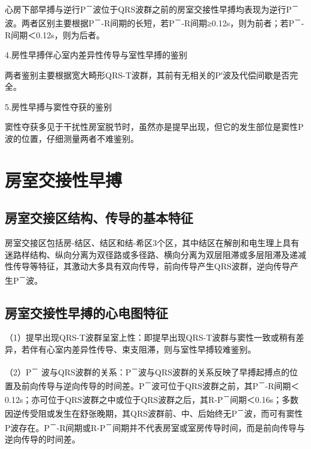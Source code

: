 心房下部早搏与逆行P\textsuperscript{－}波位于QRS波群之前的房室交接性早搏均表现为逆行P\textsuperscript{－}波。两者区别主要根据P\textsuperscript{－}-R间期的长短，若P\textsuperscript{－}-R间期≥0.12s，则为前者；若P\textsuperscript{－}-R间期＜0.12s，则为后者。

4.房性早搏伴心室内差异性传导与室性早搏的鉴别

两者鉴别主要根据宽大畸形QRS-T波群，其前有无相关的P′波及代偿间歇是否完全。

5.房性早搏与窦性夺获的鉴别

窦性夺获多见于干扰性房室脱节时，虽然亦是提早出现，但它的发生部位是窦性P波的位置，仔细测量两者不难鉴别。

\protect\hypertarget{text00018.htmlux5cux23subid143}{}{}

\section{房室交接性早搏}

\protect\hypertarget{text00018.htmlux5cux23subid144}{}{}

\subsection{房室交接区结构、传导的基本特征}

房室交接区包括房-结区、结区和结-希区3个区，其中结区在解剖和电生理上具有迷路样结构、纵向分离为双径路或多径路、横向分离为双层阻滞或多层阻滞及递减性传导等特征，其激动大多具有双向传导，前向传导产生QRS波群，逆向传导产生P\textsuperscript{－}波。

\protect\hypertarget{text00018.htmlux5cux23subid145}{}{}

\subsection{房室交接性早搏的心电图特征}

（1）提早出现QRS-T波群呈室上性：即提早出现QRS-T波群与窦性一致或稍有差异，若伴有心室内差异性传导、束支阻滞，则与室性早搏较难鉴别。

（2）P\textsuperscript{－} 波与QRS波群的关系：P\textsuperscript{－}波与QRS波群的关系反映了早搏起搏点的位置及前向传导与逆向传导的时间差。P\textsuperscript{－}波可位于QRS波群之前，其P\textsuperscript{－}-R间期＜0.12s；亦可位于QRS波群之中或位于QRS波群之后，其R-P\textsuperscript{－}间期＜0.16s；多数因逆传受阻或发生在舒张晚期，其QRS波群前、中、后始终无P\textsuperscript{－}波，而可有窦性P波存在。P\textsuperscript{－}-R间期或R-P\textsuperscript{－}间期并不代表房室或室房传导时间，而是前向传导与逆向传导的时间差。

